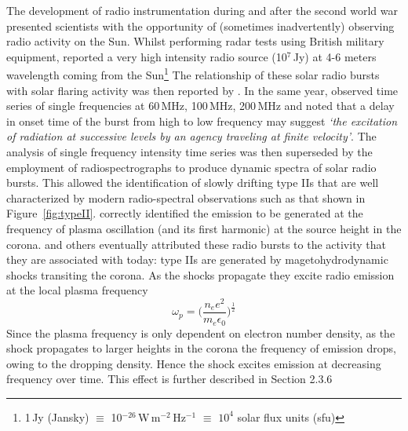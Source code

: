 The development of radio instrumentation during and after the second world war presented scientists with the opportunity of (sometimes inadvertently) observing radio activity on the Sun. Whilst performing radar tests using British military equipment, \citet{hey1946} reported a very high intensity radio source (10$^{7}$\,Jy) at 4-6 meters wavelength coming from the Sun\footnote{{\color{blue}1\,Jy (Jansky) $\equiv$ 10$^{-26}$\,W\,m$^{-2}$\,Hz$^{-1}$ $\equiv$ $10^4$ solar flux units (sfu)}} The relationship of these solar radio bursts with solar flaring activity was then reported by \citet{allen1947}. In the same year, \citet{payne1947} observed time series of single frequencies at 60\,MHz, 100\,MHz, 200\,MHz and noted that a delay in onset time of the burst from high to low frequency may suggest {\it \textquoteleft the excitation of radiation at successive levels by an agency traveling at finite velocity'}. %
The analysis of single frequency intensity time series was then superseded by the employment of radiospectrographs to produce dynamic spectra of solar radio bursts. This allowed the identification of slowly drifting type IIs that are well characterized by modern radio-spectral observations such as that shown in Figure~\ref{fig:typeII}. 
\citet{wild1954} correctly identified the emission to be generated at the frequency of plasma oscillation {\color{blue}(and its first harmonic)} at the source height in the corona. \citet{uchida1960} and others eventually attributed these radio bursts to the activity that they are associated with today: type IIs are generated by magetohydrodynamic shocks transiting the corona. As the shocks propagate they excite radio emission at the local plasma frequency
\begin{equation}
\omega_p = \bigg( \frac{n_e e^2}{m_e \epsilon_0} \bigg)^\frac{1}{2}
\end{equation}
Since the plasma frequency is only dependent on electron number density, as the shock propagates to larger heights in the corona the frequency of emission drops, owing to the dropping density. Hence the shock excites emission at decreasing frequency over time. This effect is further described in Section 2.3.6

